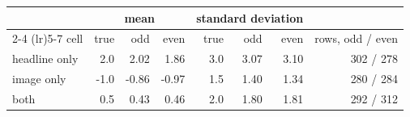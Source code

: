 \begin{tabular}{lrrrrrrr}
\toprule
 & \multicolumn{3}{c}{mean} & \multicolumn{3}{c}{standard deviation} &  \\
\cmidrule(lr){2-4} \cmidrule(lr){5-7}
cell & true & odd & even & true & odd & even & rows, odd / even \\
\midrule
headline only & 2.0 & 2.02 & 1.86 & 3.0 & 3.07 & 3.10 & 302 / 278 \\
image only & -1.0 & -0.86 & -0.97 & 1.5 & 1.40 & 1.34 & 280 / 284 \\
both & 0.5 & 0.43 & 0.46 & 2.0 & 1.80 & 1.81 & 292 / 312 \\
\bottomrule
\end{tabular}
